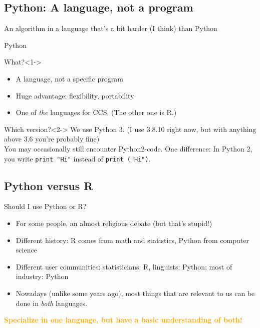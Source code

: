 \subsection{Python: A language, not a program}


\begin{frame}[plain]
	\footnotesize{An algorithm in a language that's a bit harder (I think) than Python}
\end{frame}



\begin{frame}{Python}
	\begin{block}{What?}<1->
		\begin{itemize}
			\item A language, not a specific program
			\item Huge advantage: flexibility, portability
			\item One of \emph{the} languages for CCS. \tiny{(The other one is R.)}
		\end{itemize}
	\end{block}
	
	\begin{block}{Which version?}<2->
		We use Python 3. (I use 3.8.10 right now, but with anything above 3.6 you're probably fine)\\ 
		You may occasionally still encounter Python2-code. One difference: In Python 2, you write {\tt print "Hi"} instead of {\tt print ("Hi")}.\\
	\end{block}
\end{frame}


\subsection{Python versus R}
\begin{frame}{Should I use Python or R?}
	\begin{itemize}
		\item For some people, an almost religious debate (but that's stupid!)
		\item Different history: R comes from math and statistics, Python from computer science
		\item Different user communities: statisticians: R, linguists: Python; most of industry: Python
		\item Nowadays (unlike some years ago), most things that are relevant to us can be done in \emph{both} languages.
	\end{itemize}
\pause
\textcolor{orange}{\textbf{Specialize in one language, but have a basic understanding of both!}}
\end{frame}


